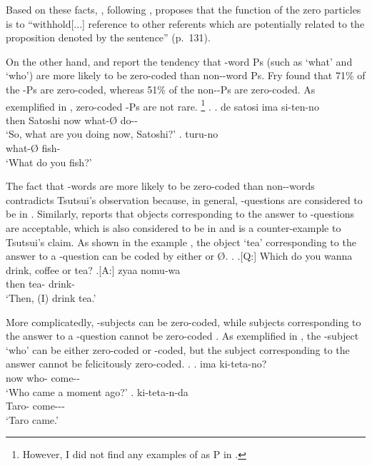 Based on these facts,
, following ,
proposes that the function of the zero particles is to
``withhold[...] reference to other referents 
which are potentially related to the proposition denoted by the sentence'' (p.~131).


On the other hand,
 and  report the tendency that
-word Ps (such as  `what' and  `who') are
more likely to be zero-coded than non--word Ps.
Fry found that 71\% of the -Ps are zero-coded,
whereas 51\% of the non--Ps are zero-coded.
As exemplified in \Next,
zero-coded -Ps are not rare.%
 \footnote{
 However, I did not find any examples of  as P in
 .
 }
%
\ex.
 \ag. de satosi ima  si-ten-no \\
      then Satoshi now what-{\O} do-- \\
      `So, what are you doing now, Satoshi?'
 \bg.  turu-no \\
      what-{\O} fish- \\
      `What do you fish?'

The fact that -words are more likely to be zero-coded than non--words contradicts Tsutsui's observation because,
in general, -questions are considered to be in .
Similarly,  reports that
objects corresponding to the answer to -questions are acceptable,
which is also considered to be in  and
is a counter-example to Tsutsui's claim.
As shown in the example \Next[A],
the object  `tea' corresponding to the answer to a -question can be coded by either  or {\O}.
%
\ex.
 \a.[Q:] Which do you wanna drink, coffee or tea?
 \bg.[A:] zyaa  nomu-wa \\
          then tea- drink- \\
          `Then, (I) drink tea.'
          \hfill{\cite[291]{niwa06}}

More complicatedly,
-subjects can be zero-coded,
while subjects corresponding to the answer to a -question cannot be zero-coded \cite{niwa06}.
As exemplified in \Next,
the -subject  `who' can be either zero-coded or -coded,
but the subject corresponding to the answer cannot be felicitously zero-coded.
%
\ex.
 \ag. ima  ki-teta-no? \\
       now who- come-- \\
       `Who came a moment ago?'
 \bg.  ki-teta-n-da \\
       Taro- come--- \\
       `Taro came.'
          \hfill{\cite[291]{niwa06}}

